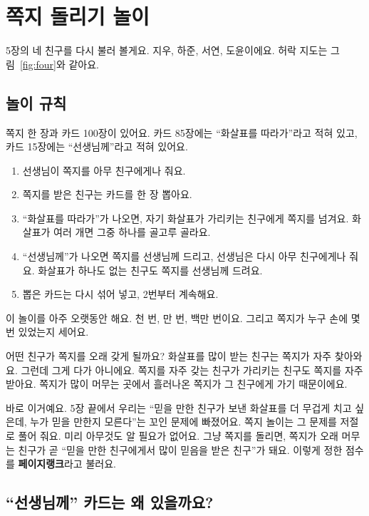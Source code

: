 \chapter{쪽지 돌리기 놀이}

5장의 네 친구를 다시 불러 볼게요.
지우, 하준, 서연, 도윤이에요.
허락 지도는 그림~\ref{fig:four}와 같아요.

\section{놀이 규칙}

쪽지 한 장과 카드 100장이 있어요.
카드 85장에는 “화살표를 따라가”라고 적혀 있고,
카드 15장에는 “선생님께”라고 적혀 있어요.

\begin{enumerate}
\item 선생님이 쪽지를 아무 친구에게나 줘요.
\item 쪽지를 받은 친구는 카드를 한 장 뽑아요.
\item “화살표를 따라가”가 나오면, 자기 화살표가 가리키는 친구에게 쪽지를 넘겨요.
      화살표가 여러 개면 그중 하나를 골고루 골라요.
\item “선생님께”가 나오면 쪽지를 선생님께 드리고, 선생님은 다시 아무 친구에게나 줘요.
      화살표가 하나도 없는 친구도 쪽지를 선생님께 드려요.
\item 뽑은 카드는 다시 섞어 넣고, 2번부터 계속해요.
\end{enumerate}

이 놀이를 아주 오랫동안 해요.
천 번, 만 번, 백만 번이요.
그리고 쪽지가 누구 손에 몇 번 있었는지 세어요.

어떤 친구가 쪽지를 오래 갖게 될까요?
화살표를 많이 받는 친구는 쪽지가 자주 찾아와요.
그런데 그게 다가 아니에요.
쪽지를 자주 갖는 친구가 가리키는 친구도 쪽지를 자주 받아요.
쪽지가 많이 머무는 곳에서 흘러나온 쪽지가 그 친구에게 가기 때문이에요.

바로 이거예요.
5장 끝에서 우리는 “믿을 만한 친구가 보낸 화살표를 더 무겁게 치고 싶은데,
누가 믿을 만한지 모른다”는 꼬인 문제에 빠졌어요.
쪽지 놀이는 그 문제를 저절로 풀어 줘요.
미리 아무것도 알 필요가 없어요.
그냥 쪽지를 돌리면, 쪽지가 오래 머무는 친구가 곧 “믿을 만한 친구에게서 많이 믿음을 받은 친구”가 돼요.
이렇게 정한 점수를 \textbf{페이지랭크}라고 불러요.

\section{“선생님께” 카드는 왜 있을까요?}

